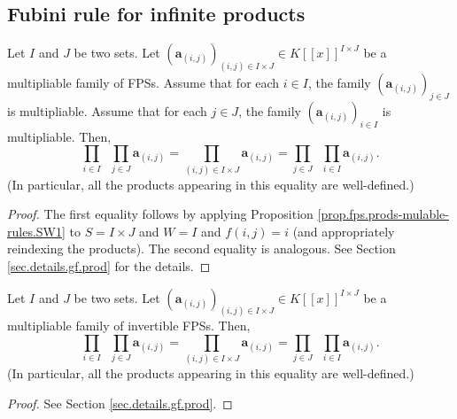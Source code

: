 \subsection{Fubini rule for infinite products}

\begin{proposition}
\label{prop.fps.prods-mulable-rules.fubini1}
\leantarget
\leanok
Let $I$ and $J$ be two sets. Let $\left(\mathbf{a}_{(i,j)}\right)_{(i,j)\in
I\times J}\in K\left[\left[x\right]\right]^{I\times J}$ be a multipliable
family of FPSs. Assume that for each $i\in I$, the family
$\left(\mathbf{a}_{(i,j)}\right)_{j\in J}$ is multipliable. Assume that for
each $j\in J$, the family $\left(\mathbf{a}_{(i,j)}\right)_{i\in I}$ is
multipliable. Then,
\[
\prod_{i\in I}\;\;\prod_{j\in J}\mathbf{a}_{(i,j)}
=\prod_{(i,j)\in I\times J}\mathbf{a}_{(i,j)}
=\prod_{j\in J}\;\;\prod_{i\in I}\mathbf{a}_{(i,j)}.
\]
(In particular, all the products appearing in this equality are well-defined.)
\end{proposition}

\begin{proof}
The first equality follows by applying Proposition
\ref{prop.fps.prods-mulable-rules.SW1} to $S=I\times J$ and $W=I$ and
$f(i,j)=i$ (and appropriately reindexing the products). The second equality
is analogous. See Section \ref{sec.details.gf.prod} for the details.
\end{proof}

\begin{proposition}
\label{prop.fps.prods-mulable-rules.fubini}
\leantarget
\leanok
Let $I$ and $J$ be two sets. Let $\left(\mathbf{a}_{(i,j)}\right)_{(i,j)\in
I\times J}\in K\left[\left[x\right]\right]^{I\times J}$ be a multipliable
family of invertible FPSs. Then,
\[
\prod_{i\in I}\;\;\prod_{j\in J}\mathbf{a}_{(i,j)}
=\prod_{(i,j)\in I\times J}\mathbf{a}_{(i,j)}
=\prod_{j\in J}\;\;\prod_{i\in I}\mathbf{a}_{(i,j)}.
\]
(In particular, all the products appearing in this equality are well-defined.)
\end{proposition}

\begin{proof}
See Section \ref{sec.details.gf.prod}.
\end{proof}
